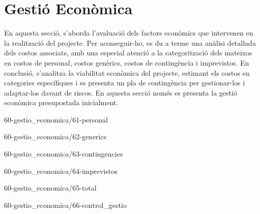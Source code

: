 \chapter{Gestió Econòmica}
En aquesta secció, s'aborda l'avaluació dels factors econòmics que intervenen en la realització del projecte. Per aconseguir-ho, es du a terme una anàlisi detallada dels costos associats, amb una especial atenció a la categorització dels mateixos en costos de personal, costos genèrics, costos de contingència i imprevistos. En conclusió, s'analitza la viabilitat econòmica del projecte, estimant els costos en categories específiques i es presenta un pla de contingència per gestionar-los i adaptar-los davant de riscos. En aquesta secció només es presenta la gestió econòmica presupostada inicialment.

{60-gestio_economica/61-personal}

{60-gestio_economica/62-generics}

{60-gestio_economica/63-contingencies}

{60-gestio_economica/64-imprevistos}

{60-gestio_economica/65-total}

{60-gestio_economica/66-control_gestio}
